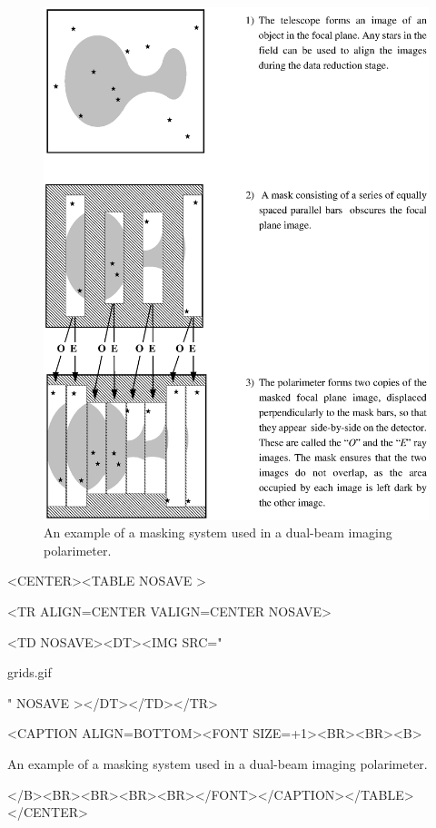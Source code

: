 \documentclass[twoside,11pt]{article}
\newenvironment{latexonly}{}{}
\renewcommand{\_}{\texttt{\symbol{95}}}
\newcommand{\htmlfig}[3]{
   \label{#1}
   \begin{rawhtml} <CENTER><TABLE NOSAVE > \end{rawhtml}
   \begin{rawhtml} <TR ALIGN=CENTER VALIGN=CENTER NOSAVE> \end{rawhtml}
   \begin{rawhtml} <TD NOSAVE><DT><IMG SRC=" \end{rawhtml}
   #2
   \begin{rawhtml} " NOSAVE ></DT></TD></TR> \end{rawhtml}
   \begin{rawhtml} <CAPTION ALIGN=BOTTOM><FONT SIZE=+1><BR><BR><B> \end{rawhtml}
   #3 
   \begin{rawhtml} </B><BR><BR><BR><BR></FONT></CAPTION></TABLE></CENTER> \end{rawhtml}
}
\begin{document}
\begin{latexonly}
  \begin{figure}[p]
  \begin{center}
  \includegraphics[clip,scale=0.8]{sun223_figures/grids.eps}
  \caption{An example of a masking system used in a dual-beam imaging polarimeter.}
  \label{fig:grids}
  \end{center}
  \end{figure}
\end{latexonly}

\begin{htmlonly}
\htmlfig{fig:grids}{grids.gif}{An example of a masking system used in 
a dual-beam imaging polarimeter.}
\end{htmlonly}
\end{document}

